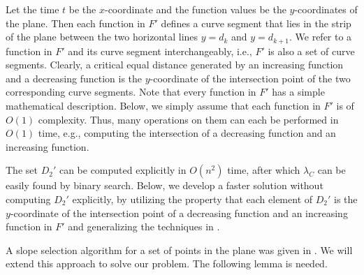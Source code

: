 \documentclass[11pt]{article}
\begin{document}
Let the time $t$ be the $x$-coordinate and the function values be
the $y$-coordinates of the plane. Then each function in $F'$ defines a curve
segment that lies in the strip of the plane between the two horizontal lines
$y=d_k$ and $y=d_{k+1}$. We refer to a function in
$F'$ and its curve segment interchangeably, i.e., $F'$ is
also a set of curve segments. Clearly, a critical equal distance generated by an
increasing function and a decreasing function is the $y$-coordinate of
the intersection point of the two corresponding curve segments.
Note that every function in $F'$
has a simple mathematical description. Below, we simply assume that
each function in $F'$ is of $O(1)$ complexity. Thus, many
operations on them can each be performed in $O(1)$ time, e.g., computing the
intersection of a decreasing function and an increasing function.

The set $D_2'$ can be computed explicitly in $O(n^2)$ time, after
which $\lambda_C$ can be easily found by binary search. Below, we develop a faster
solution without computing $D_2'$ explicitly, by utilizing
the property that each element of $D_2'$ is the $y$-coordinate of the
intersection point of a decreasing function and an increasing function in
$F'$ and generalizing the techniques in \cite{ref:ColeAn89}.

A slope selection algorithm for a set of points in the plane was given in
\cite{ref:ColeAn89}. We will extend this approach to solve our problem.
The following lemma is needed.
\end{document}
